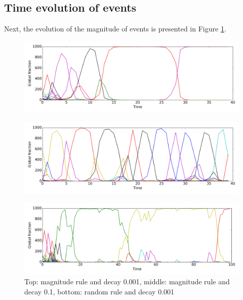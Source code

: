 \documentclass [12pt,a4paper,twoside]{article}
\begin{document}
\subsection{Time evolution of events}
Next, the evolution of the magnitude of events is presented in Figure \ref{event_history}.
\begin{figure}[H]
\includegraphics[scale=0.4]{report/event_histories/time_evolution_r1_decay0001_short}

\end{figure}
\begin{figure}[h!]
\includegraphics[scale=0.4]{report/event_histories/time_evolution_r1_decay0100_short}
\end{figure}
\begin{figure}[h!]
\includegraphics[scale=0.4]{report/event_histories/time_evolution_r2_decay0001}
\caption{Top: magnitude rule and decay 0.001, middle: magnitude rule and decay 0.1, bottom: random rule and decay 0.001}
\label{event_history}
\end{figure}
\end{document}
